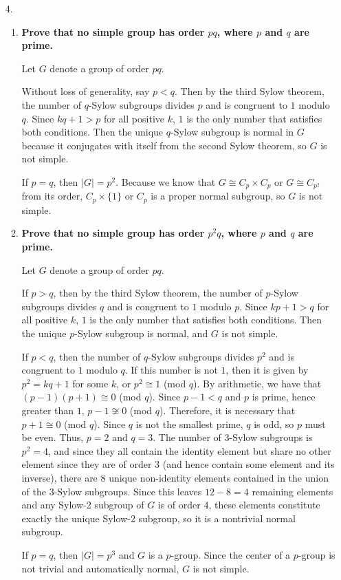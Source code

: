 \documentclass[a4paper,12pt]{article}
\begin{document}
\begin{enumerate}
    \item[4.]
        \begin{enumerate}[label=(\alph*)]
            \item
                \boldmath
                \textbf{Prove that no simple group has order $pq$, where $p$ and $q$ are prime.} \par
                \unboldmath
                Let $G$ denote a group of order $pq$. \par
                Without loss of generality, say $p < q$. Then by the third Sylow theorem, the number of $q$-Sylow subgroups divides $p$ and is congruent to $1$ modulo $q$. Since $kq + 1 > p$ for all positive $k$, $1$ is the only number that satisfies both conditions. Then the unique $q$-Sylow subgroup is normal in $G$ because it conjugates with itself from the second Sylow theorem, so $G$ is not simple. \par
                If $p = q$, then $|G| = p^2$. Because we know that $G \cong C_p \times C_p$ or $G \cong C_{p^2}$ from its order, $C_p \times \{ 1 \}$ or $C_p$ is a proper normal subgroup, so $G$ is not simple.

            \item
                \boldmath
                \textbf{Prove that no simple group has order $p^2 q$, where $p$ and $q$ are prime.} \par
                \unboldmath
                Let $G$ denote a group of order $pq$. \par
                If $p > q$, then by the third Sylow theorem, the number of $p$-Sylow subgroups divides $q$ and is congruent to $1$ modulo $p$. Since $kp + 1> q$ for all positive $k$, $1$ is the only number that satisfies both conditions. Then the unique $p$-Sylow subgroup is normal, and $G$ is not simple. \par
                If $p < q$, then the number of $q$-Sylow subgroups divides $p^2$ and is congruent to $1$ modulo $q$. If this number is not $1$, then it is given by $p^2 = kq + 1$ for some $k$, or $p^2 \cong 1$ (mod $q$). By arithmetic, we have that $(p - 1)(p + 1) \cong 0$ (mod $q$). Since $p - 1 < q$ and $p$ is prime, hence greater than $1$, $p - 1 \not\cong 0$ (mod $q$). Therefore, it is necessary that $p + 1 \cong 0$ (mod $q$). Since $q$ is not the smallest prime, $q$ is odd, so $p$ must be even. Thus, $p = 2$ and $q = 3$. The number of $3$-Sylow subgroups is $p^2 = 4$, and since they all contain the identity element but share no other element since they are of order $3$ (and hence contain some element and its inverse), there are $8$ unique non-identity elements contained in the union of the $3$-Sylow subgroups. Since this leaves $12 - 8 = 4$ remaining elements and any Sylow-2 subgroup of $G$ is of order $4$, these elements constitute exactly the unique Sylow-2 subgroup, so it is a nontrivial normal subgroup. \par
                If $p = q$, then $|G| = p^3$ and $G$ is a $p$-group. Since the center of a $p$-group is not trivial and automatically normal, $G$ is not simple.
        \end{enumerate}


\end{enumerate}
\end{document}
